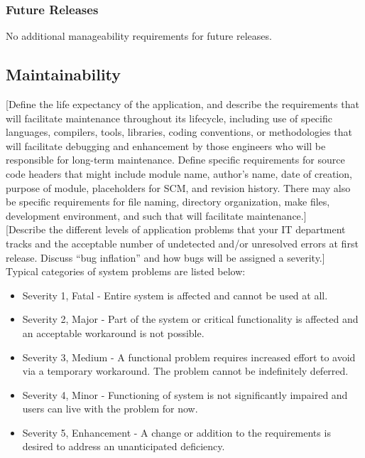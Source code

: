 \documentclass[12pt]{article}
\begin{document}
\subsubsection{Future Releases}
No additional manageability requirements for future releases.


\subsection{Maintainability}

[Define the life expectancy of the application, and describe the requirements that will facilitate maintenance throughout its 
lifecycle, including use of specific languages, compilers, tools, libraries, coding conventions, or methodologies that will 
facilitate debugging and enhancement by those engineers who will be responsible for long-term maintenance. Define specific 
requirements for source code headers that might include module name, author's name, date of creation, purpose of module, placeholders 
for SCM, and revision history. There may also be specific requirements for file naming, directory organization, make files, development 
environment, and such that will facilitate maintenance.]\\

[Describe the different levels of application problems that your IT department tracks and the acceptable number of undetected and/or 
unresolved errors at first release. Discuss ``bug inflation'' and how bugs will be assigned a severity.]\\

Typical categories of system problems are listed below:
\begin{itemize}
	\item Severity 1, Fatal - Entire system is affected and cannot be used at all.
	\item Severity 2, Major - Part of the system or critical functionality is affected and an acceptable workaround is not possible.
	\item Severity 3, Medium - A functional problem requires increased effort to avoid via a temporary workaround. The problem cannot be indefinitely deferred.
	\item Severity 4, Minor - Functioning of system is not significantly impaired and users can live with the problem for now.
	\item Severity 5, Enhancement - A change or addition to the requirements is desired to address an unanticipated deficiency.
\end{itemize}
\end{document}
